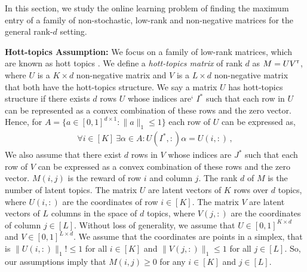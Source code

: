 
In this section, we study the online learning problem of finding the maximum entry of a family of non-stochastic, low-rank and non-negative matrices for the general rank-$d$ setting.  

\textbf{Hott-topics Assumption:} We focus on a family of low-rank matrices, which are known as hott topics \citep{recht2012factoring}. We define a \emph{hott-topics matrix} of rank $d$ as $M = U V^\mathsf{\scriptscriptstyle T}$, where $U$ is a $K \times d$ non-negative matrix and $V$ is a $L \times d$ non-negative matrix that both have the hott-topics structure. We say a matrix  $U$  has hott-topics structure if  there exists $d$ rows  $U$ whose indices are` $I^\ast$ such that each row in $U$ can be represented as a convex combination of these rows  and the zero vector. Hence, for $A = \{a \in [0, 1]^{d \times 1}: \|a\|_1 \leq 1\}$ each row of $U$ can be expressed as,
\begin{align}
  \forall i \in [K] \ \exists \alpha \in A: U(I^\ast, :) \alpha = U(i, :)\,,
  \label{eq:hott topics1}
\end{align}
We also assume that there exist $d$ rows in $V$ whose indices are $J^\ast$ such that each row of $V$ can be expressed as a convex combination of these rows  and the zero vector.
$M(i, j)$ is the reward of row $i$ and column $j$. The rank $d$ of $M$ is the number of latent topics. The matrix $U$ are latent vectors of $K$ rows over $d$ topics, where $U(i, :)$ are the coordinates of row $i \in [K]$. The matrix $V$ are latent vectors of $L$ columns in the space of $d$ topics, where $V(j, :)$ are the coordinates of column $j \in [L]$. Without loss of generality, we assume that $U \in [0, 1]^{K \times d}$ and $V \in [0, 1]^{L \times d}$. We assume that the coordinates are points in a simplex, that is $\|U(i, :)\|_1 !\leq \!1$ for all $i \in [K]$ and $\|V(j, :)\|_1 \!\leq\! 1$ for all $j \in [L]$. So, our assumptions imply that $\!M(i, j) \!\geq\! 0$ for any $i \!\in \![K]$ and $j \!\in\! [L]$.


